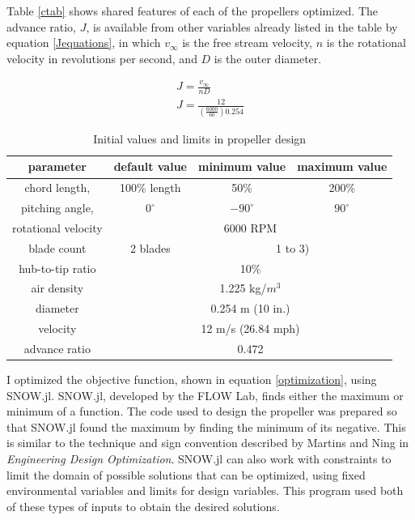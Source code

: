 \documentclass[journal ]{new-aiaa}
\newcounter{ctab}
\begin{document}
Table \eqref{ctab} shows shared features of each of the propellers optimized. The advance ratio, $J$, is available from other variables already listed in the table by equation \eqref{Jequations}, in which $v_{\infty}$ is the free stream velocity, $n$ is the rotational velocity in revolutions per second, and $D$ is the outer diameter.

\begin{equation}
	\begin{aligned}
	J = \frac{v_{\infty}}{n D} \\
	J = \frac{12}{(\frac{6000}{60}) 0.254}
	\end{aligned}
	\label{Jequations}
\end{equation}

\begin{table}[H]
 \centering
 \begin{tabular}{| c | c | c | c |} \hline
 	 \textbf{parameter} & \textbf{default value} & \textbf{minimum value} & \textbf{maximum value} \\ \hline
	 chord length, & 100\% length & 50\% & 200\% \\ \hline
	 pitching angle, & $0^{\circ}$ & $-90^{\circ}$ & $90^{\circ}$ \\ \hline \hline
	 rotational velocity & \multicolumn{3}{c|}{6000 RPM} \\ \hline
	 blade count & 2 blades & \multicolumn{2}{c|}{1 to 3)}\\ \hline
	 hub-to-tip ratio & \multicolumn{3}{c|}{10\%} \\ \hline
	 air density & \multicolumn{3}{c|}{1.225 kg/$m^{3}$} \\ \hline
	 diameter & \multicolumn{3}{c|}{0.254 m (10 in.)} \\ \hline
	 velocity & \multicolumn{3}{c|}{12 m/s (26.84 mph)} \\ \hline
	 advance ratio & \multicolumn{3}{c|}{0.472} \\ \hline
 \end{tabular}
 \caption{Initial values and limits in propeller design}
 \label{ctab}
\end{table}

I optimized the objective function, shown in equation \eqref{optimization}, using SNOW.jl. SNOW.jl, developed by the FLOW Lab, finds either the maximum or minimum of a function. The code used to design the propeller was prepared so that SNOW.jl found the maximum by finding the minimum of its negative. This is similar to the technique and sign convention described by Martins and Ning in \emph{Engineering Design Optimization}\cite{EngDesOpt}. SNOW.jl can also work with constraints to limit the domain of possible solutions that can be optimized, using fixed environmental variables and limits for design variables. This program used both of these types of inputs to obtain the desired solutions.
\end{document}
